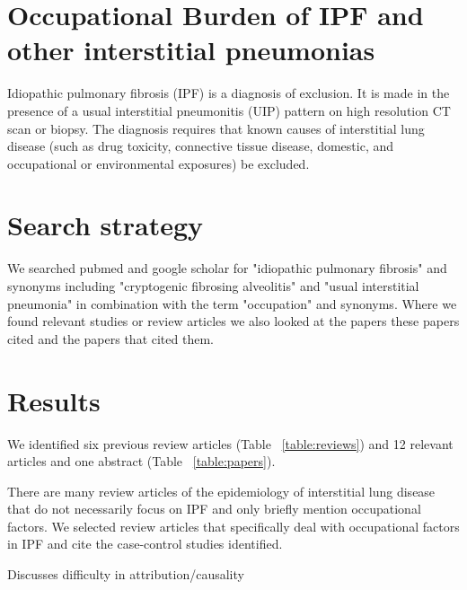 \documentclass[a4paper,12pt]{article}
\author{Carl Reynolds \\
\small National Heart \& Lung Institute, Imperial College London }
\begin{document}


\section*{\centering Occupational Burden of IPF and other interstitial pneumonias}

Idiopathic pulmonary fibrosis (IPF) is a diagnosis of exclusion. It is made in the
presence of a usual interstitial pneumonitis (UIP) pattern on high resolution CT scan
or biopsy. The diagnosis requires that known causes of interstitial lung disease
(such as drug toxicity, connective tissue disease, domestic, and occupational or
environmental exposures) be excluded\cite{Travis2013}.



\section{Search strategy}

We searched pubmed and google scholar for "idiopathic pulmonary fibrosis" and synonyms including "cryptogenic fibrosing alveolitis" and "usual interstitial pneumonia" in combination with the term "occupation" and synonyms. Where we found relevant studies or review articles we also looked at the papers these papers cited and the papers that cited them. 

\section{Results}

We identified six previous review articles (Table ~\ref{table:reviews})\cite{Turner-Warwick1998} and 12 relevant articles and one abstract (Table ~\ref{table:papers}).

There are many review articles of the epidemiology of interstitial lung disease that do not necessarily focus on IPF and only briefly mention occupational factors. We selected review articles that specifically deal with occupational factors in IPF and cite the case-control studies identified.




\cite{Turner-Warwick1998} Discusses difficulty in attribution/causality
\end{document}
